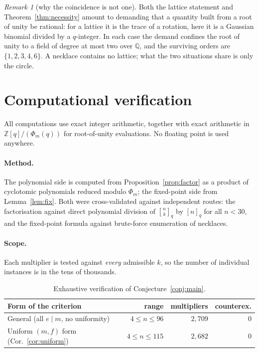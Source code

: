 \documentclass[11pt,a4paper]{article}
\theoremstyle{plain}
\theoremstyle{definition}
\theoremstyle{remark}
\newtheorem{remark}[theorem]{Remark}
\newcommand{\Z}{\mathbb{Z}}
\newcommand{\Q}{\mathbb{Q}}
\newcommand{\qint}[1]{[#1]_q}
\newcommand{\qbin}[2]{\genfrac[]{0pt}{}{#1}{#2}_{q}}
\begin{document}
\begin{remark}[why the coincidence is not one]
Both the lattice statement and Theorem~\ref{thm:necessity} amount to demanding that a
quantity built from a root of unity be rational: for a lattice it is the trace of a
rotation, here it is a Gaussian binomial divided by a $q$-integer. In each case the demand
confines the root of unity to a field of degree at most two over $\Q$, and the surviving
orders are $\{1,2,3,4,6\}$. A necklace contains no lattice; what the two situations share is
only the circle.
\end{remark}

\section{Computational verification}\label{sec:verification}

All computations use exact integer arithmetic, together with exact arithmetic in
$\Z[q]/(\Phi_m(q))$ for root-of-unity evaluations. No floating point is used anywhere.

\paragraph{Method.} The polynomial side is computed from Proposition~\ref{prop:factor} as a
product of cyclotomic polynomials reduced modulo $\Phi_m$; the fixed-point side from
Lemma~\ref{lem:fix}. Both were cross-validated against independent routes: the factorisation
against direct polynomial division of $\qbin{n}{k}$ by $\qint{n}$ for all $n<30$, and the
fixed-point formula against brute-force enumeration of necklaces.

\paragraph{Scope.} Each multiplier is tested against \emph{every} admissible $k$, so the
number of individual instances is in the tens of thousands.

\begin{table}[h]
\centering
\small
\begin{tabular}{lrrr}
Form of the criterion & range & multipliers & counterex.\\\hline
General (all $e\mid m$, no uniformity) & $4\le n\le 96$ & $2{,}709$ & $0$\\
Uniform $(m,f)$ form (Cor.~\ref{cor:uniform}) & $4\le n\le 115$ & $2{,}682$ & $0$\\
\end{tabular}
\caption{Exhaustive verification of Conjecture~\ref{conj:main}.}
\label{tab:verification}
\end{table}
\end{document}
